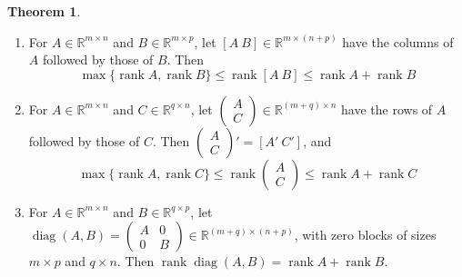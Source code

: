 \documentclass[12pt]{article}
\newcommand{\R}{\mathbb R}
\DeclareMathOperator{\diag}{diag}
\DeclareMathOperator{\rank}{rank}
\theoremstyle{definition}
\newtheorem{theorem}{Theorem}
\begin{document}
\begin{theorem}\label{thm:r4-partitioned}
\begin{enumerate}
\item For \(A\in\R^{m\times n}\) and \(B\in\R^{m\times p}\), let \([A\ B]\in\R^{m\times(n+p)}\) have
the columns of \(A\) followed by those of \(B\). Then
\[
\max\{\rank A,\rank B\}\leqslant\rank[A\ B]\leqslant\rank A+\rank B
\]
\item For \(A\in\R^{m\times n}\) and \(C\in\R^{q\times n}\), let
\(\left(\begin{smallmatrix}A\\C\end{smallmatrix}\right)\in\R^{(m+q)\times n}\) have the rows of \(A\)
followed by those of \(C\). Then \(\left(\begin{smallmatrix}A\\C\end{smallmatrix}\right)'=[A'\ C']\), and
\[
\max\{\rank A,\rank C\}\leqslant\rank\begin{pmatrix}A\\C\end{pmatrix}\leqslant\rank A+\rank C
\]
\item For \(A\in\R^{m\times n}\) and \(B\in\R^{q\times p}\), let
\(\diag(A,B)=\left(\begin{smallmatrix}A&0\\0&B\end{smallmatrix}\right)\in\R^{(m+q)\times(n+p)}\), with
zero blocks of sizes \(m\times p\) and \(q\times n\). Then \(\rank\diag(A,B)=\rank A+\rank B\).
\end{enumerate}
\end{theorem}
\end{document}
